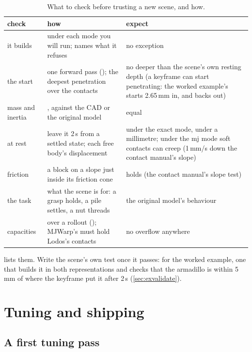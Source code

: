 \begin{table}[t]
\centering
\caption{What to check before trusting a new scene, and how.}
\label{tab:checks}
\small
\begin{tabularx}{\linewidth}{@{}L{25mm}YL{40mm}@{}}
\toprule
check & how & expect \\
\midrule
it builds &  under each mode you will run;  names what it refuses & no exception \\
the start & one forward pass (); the deepest penetration over the contacts & no deeper than the scene's own resting depth (a keyframe can start penetrating: the worked example's starts 2.65\,mm in, and backs out) \\
mass and inertia & ,  against the CAD or the original model & equal \\
at rest & leave it 2\,s from a settled state; each free body's displacement & under the exact mode, under a millimetre; under the mj mode soft contacts can creep (1\,mm/s down the contact manual's slope) \\
friction & a block on a slope just inside its friction cone & holds (the contact manual's slope test) \\
the task & what the scene is for: a grasp holds, a pile settles, a nut threads & the original model's behaviour \\
capacities &  over a rollout (); MJWarp's must hold Lodos's contacts & no overflow anywhere \\
\bottomrule
\end{tabularx}
\end{table}

 lists them. Write the scene's own test once it passes: for the worked example, one that builds it in both representations and checks that the armadillo is within 5\,mm of where the keyframe put it after 2\,s (\cref{sec:exvalidate}).

\section{Tuning and shipping}\label{sec:ship}

\subsection{A first tuning pass}\label{sec:firstpass}

